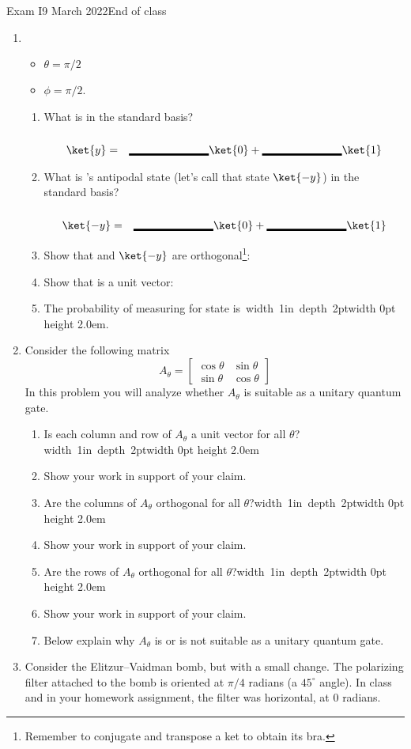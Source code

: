 \documentclass[12pt]{article}
\newcommand{\Blank}[1][1in]{\mbox{\vrule width #1 depth 2pt}\vrule width 0pt height 2.0em}
\begin{document}
\begin{assignment}{Exam I}{9 March 2022}{End of class}
\begin{enumerate}
\item{}
\begin{itemize}
\item
$\theta=\pi/2$ 
\item  $\phi=\pi/2$.
\end{itemize}
\begin{enumerate}
  \item{} What is  in the standard basis?
\begin{eqnarray*}
   \ket{y} & = & \Blank \ket{0} + \Blank \ket{1}
\end{eqnarray*}
  \item{}  What is 's antipodal state (let's call that
state $\ket{-y}$) in the standard
basis?
\begin{eqnarray*}
   \ket{-y} & = & \Blank \ket{0} + \Blank \ket{1}
\end{eqnarray*}
  \item{} Show that  and $\ket{-y}$ are orthogonal\footnote{%
Remember to conjugate and transpose a ket to obtain its bra.}:
\LeaveSpace{1in}
  \item{} Show that  is a unit vector:
\LeaveSpace{1in}
  \item{} The probability of measuring  for state  is~\Blank{}.
\end{enumerate}

\clearpage\item{}
Consider the following matrix
\[
A_{\theta}=
\begin{bmatrix}
\cos{\theta} & \sin{\theta} \\
\sin{\theta} & \cos{\theta}
\end{bmatrix}
\]
In this problem you will analyze whether $A_{\theta}$ is suitable as a unitary quantum
gate.
\begin{enumerate}
 \item{} Is each column and row of $A_\theta$ a unit vector for all
$\theta$?\Blank{}
 \item{} Show your work in support of your claim.
\LeaveSpace{2cm}
 \item{} Are the columns of $A_\theta$ orthogonal for all $\theta$?\Blank{}
 \item{} Show your work in support of your claim.
\LeaveSpace{2cm}
 \item{} Are the rows of $A_\theta$ orthogonal for all $\theta$?\Blank{}
 \item{} Show your work in support of your claim.
\LeaveSpace{2cm}
  \item{} Below explain why $A_\theta$ is or is not suitable as a
unitary quantum gate.
\LeaveSpace{2cm}
\end{enumerate}
\clearpage\item{}
Consider the Elitzur--Vaidman bomb, but with a small change.  The
polarizing filter attached to the bomb is
oriented at $\pi/4$ radians (a $45^{\circ}$ angle).  In class and in your homework assignment,
the filter was horizontal, at $0$ radians.


\end{enumerate}
\end{assignment}
\end{document}
